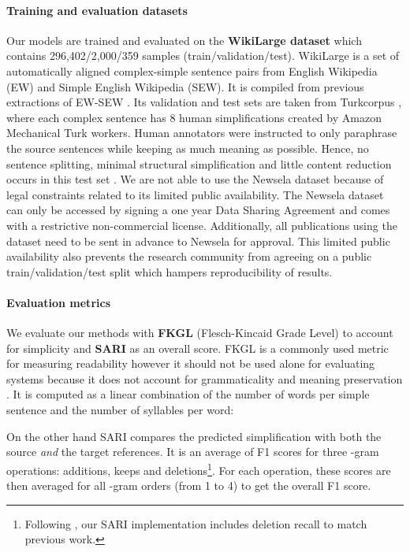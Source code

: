 \documentclass[10pt, a4paper]{article}
\begin{document}
\paragraph{Training and evaluation datasets}
Our models are trained and evaluated on the \textbf{WikiLarge dataset}  which contains 296,402/2,000/359 samples (train/validation/test).
WikiLarge is a set of automatically aligned complex-simple sentence pairs from English Wikipedia (EW) and Simple English Wikipedia (SEW). It is compiled from previous extractions of EW-SEW \cite{zhu2010monolingual,woodsend2011learning,kauchak2013improving}.
Its validation and test sets are taken from Turkcorpus , where each complex sentence has 8 human simplifications created by Amazon Mechanical Turk workers.
Human annotators were instructed to only paraphrase the source sentences while keeping as much meaning as possible. Hence, no sentence splitting, minimal structural simplification and little content reduction occurs in this test set \cite{xu2016optimizing}.
We are not able to use the Newsela dataset  because of legal constraints related to its limited public availability. The Newsela dataset can only be accessed by signing a one year Data Sharing Agreement and comes with a restrictive non-commercial license.
Additionally, all publications using the dataset need to be sent in advance to Newsela for approval.
This limited public availability also prevents the research community from agreeing on a public train/validation/test split which hampers reproducibility of results.

\paragraph{Evaluation metrics}
We evaluate our methods with \textbf{FKGL} (Flesch-Kincaid Grade Level)  \cite{kincaid1975derivation} to account for simplicity and \textbf{SARI} \cite{xu2016optimizing} as an overall score.
FKGL is a commonly used metric for measuring readability however it should not be used alone for evaluating systems because it does not account for grammaticality and meaning preservation \cite{wubben2012sentence}. It is computed as a linear combination of the number of words per simple sentence and the number of syllables per word:



On the other hand SARI compares the predicted simplification with both the source \textit{and} the target references. It is an average of F1 scores for three -gram operations: additions, keeps and deletions\footnote{Following , our SARI implementation includes deletion recall to match previous work.}. For each operation, these scores are then averaged for all -gram orders (from 1 to 4) to get the overall F1 score.
\end{document}
